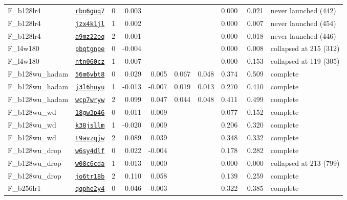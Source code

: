 \begin{tabular}{@{}llrrrrrrrl@{}}
\addlinespace
F\_b128lr4 & \href{https://wandb.ai/zhao-group/torchcell_019_expr_v22/runs/rbn6guq7}{\texttt{rbn6guq7}} & 0 & 0.003 &  &  &  & 0.000 & 0.021 & never launched (442) \\
F\_b128lr4 & \href{https://wandb.ai/zhao-group/torchcell_019_expr_v22/runs/jzx4kljl}{\texttt{jzx4kljl}} & 1 & 0.002 &  &  &  & 0.000 & 0.007 & never launched (454) \\
F\_b128lr4 & \href{https://wandb.ai/zhao-group/torchcell_019_expr_v22/runs/a9mz22oq}{\texttt{a9mz22oq}} & 2 & 0.001 &  &  &  & 0.000 & 0.018 & never launched (446) \\
\addlinespace
F\_l4w180 & \href{https://wandb.ai/zhao-group/torchcell_019_expr_v22/runs/pbqtgnpe}{\texttt{pbqtgnpe}} & 0 & -0.004 &  &  &  & 0.000 & 0.008 & collapsed at 215 (312) \\
F\_l4w180 & \href{https://wandb.ai/zhao-group/torchcell_019_expr_v22/runs/ntn060cz}{\texttt{ntn060cz}} & 1 & -0.007 &  &  &  & 0.000 & -0.153 & collapsed at 119 (305) \\
\addlinespace
F\_b128wu\_hadam & \href{https://wandb.ai/zhao-group/torchcell_019_expr_v22/runs/56m6vbt8}{\texttt{56m6vbt8}} & 0 & 0.029 & 0.005 & 0.067 & 0.048 & 0.374 & 0.509 & complete \\
F\_b128wu\_hadam & \href{https://wandb.ai/zhao-group/torchcell_019_expr_v22/runs/j3l6huyu}{\texttt{j3l6huyu}} & 1 & -0.013 & -0.007 & 0.019 & 0.013 & 0.270 & 0.410 & complete \\
F\_b128wu\_hadam & \href{https://wandb.ai/zhao-group/torchcell_019_expr_v22/runs/wcp7wryw}{\texttt{wcp7wryw}} & 2 & 0.099 & 0.047 & 0.044 & 0.048 & 0.411 & 0.499 & complete \\
\addlinespace
F\_b128wu\_wd & \href{https://wandb.ai/zhao-group/torchcell_019_expr_v22/runs/18gw3p46}{\texttt{18gw3p46}} & 0 & 0.011 & 0.009 &  &  & 0.077 & 0.152 & complete \\
F\_b128wu\_wd & \href{https://wandb.ai/zhao-group/torchcell_019_expr_v22/runs/k38jsllm}{\texttt{k38jsllm}} & 1 & -0.020 & 0.009 &  &  & 0.206 & 0.320 & complete \\
F\_b128wu\_wd & \href{https://wandb.ai/zhao-group/torchcell_019_expr_v22/runs/t9avzqjw}{\texttt{t9avzqjw}} & 2 & 0.089 & 0.039 &  &  & 0.348 & 0.332 & complete \\
\addlinespace
F\_b128wu\_drop & \href{https://wandb.ai/zhao-group/torchcell_019_expr_v22/runs/w6sy4dlf}{\texttt{w6sy4dlf}} & 0 & 0.022 & -0.004 &  &  & 0.178 & 0.282 & complete \\
F\_b128wu\_drop & \href{https://wandb.ai/zhao-group/torchcell_019_expr_v22/runs/w08c6cda}{\texttt{w08c6cda}} & 1 & -0.013 & 0.000 &  &  & 0.000 & -0.000 & collapsed at 213 (799) \\
F\_b128wu\_drop & \href{https://wandb.ai/zhao-group/torchcell_019_expr_v22/runs/jo6tr18b}{\texttt{jo6tr18b}} & 2 & 0.110 & 0.058 &  &  & 0.139 & 0.259 & complete \\
\addlinespace
F\_b256lr1 & \href{https://wandb.ai/zhao-group/torchcell_019_expr_v22/runs/qqphe2y4}{\texttt{qqphe2y4}} & 0 & 0.046 & -0.003 &  &  & 0.322 & 0.385 & complete \\
\bottomrule
\end{tabular}
